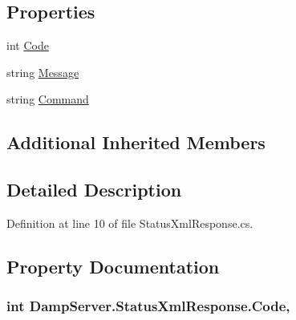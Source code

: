 \subsection*{Properties}
\begin{DoxyCompactItemize}
\item 
int \hyperlink{class_damp_server_1_1_status_xml_response_ae07a4925f2e4bd79e108eecb4ceb1751}{Code}
\item 
string \hyperlink{class_damp_server_1_1_status_xml_response_a1b9e014c3a793fadac149bf22ed53362}{Message}
\item 
string \hyperlink{class_damp_server_1_1_status_xml_response_af550507a0d63fe5f9ec4e7f11f3e5141}{Command}
\end{DoxyCompactItemize}
\subsection*{Additional Inherited Members}


\subsection{Detailed Description}


Definition at line 10 of file Status\-Xml\-Response.\-cs.



\subsection{Property Documentation}
\hypertarget{class_damp_server_1_1_status_xml_response_ae07a4925f2e4bd79e108eecb4ceb1751}{
\subsubsection[{Code}]{\setlength{\rightskip}{0pt plus 5cm}int Damp\-Server.\-Status\-Xml\-Response.\-Code\hspace{0.3cm}{\ttfamily [get]}, {\ttfamily [set]}}}\label{class_damp_server_1_1_status_xml_response_ae07a4925f2e4bd79e108eecb4ceb1751}


